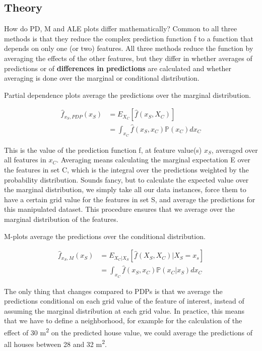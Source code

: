 \documentclass[
  12pt,
]{krantz}
\begin{document}
\hypertarget{theory-2}{%
\subsection{Theory}\label{theory-2}}

How do PD, M and ALE plots differ mathematically?
Common to all three methods is that they reduce the complex prediction function f to a function that depends on only one (or two) features.
All three methods reduce the function by averaging the effects of the other features, but they differ in whether averages of predictions or of \textbf{differences in predictions} are calculated and whether averaging is done over the marginal or conditional distribution.

Partial dependence plots average the predictions over the marginal distribution.

\begin{align*}\hat{f}_{x_S,PDP}(x_S)&=E_{X_C}\left[\hat{f}(x_S,X_C)\right]\\&=\int_{x_C}\hat{f}(x_S,x_C)\mathbb{P}(x_C)d{}x_C\end{align*}

This is the value of the prediction function f, at feature value(s) \(x_S\), averaged over all features in \(x_C\).
Averaging means calculating the marginal expectation E over the features in set C, which is the integral over the predictions weighted by the probability distribution.
Sounds fancy, but to calculate the expected value over the marginal distribution, we simply take all our data instances, force them to have a certain grid value for the features in set S, and average the predictions for this manipulated dataset.
This procedure ensures that we average over the marginal distribution of the features.

M-plots average the predictions over the conditional distribution.

\begin{align*}\hat{f}_{x_S,M}(x_S)&=E_{X_C|X_S}\left[\hat{f}(X_S,X_C)|X_S=x_s\right]\\&=\int_{x_C}\hat{f}(x_S,x_C)\mathbb{P}(x_C|x_S)d{}x_C\end{align*}

The only thing that changes compared to PDPs is that we average the predictions conditional on each grid value of the feature of interest, instead of assuming the marginal distribution at each grid value.
In practice, this means that we have to define a neighborhood, for example for the calculation of the effect of 30 m\textsuperscript{2} on the predicted house value, we could average the predictions of all houses between 28 and 32 m\textsuperscript{2}.
\end{document}
